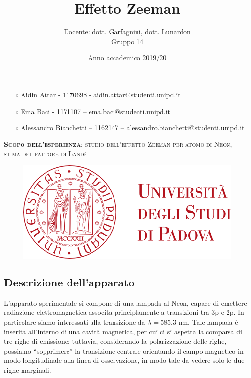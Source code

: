 \documentclass{article}
\title{Effetto Zeeman}
\author{Docente: dott. Garfagnini, dott. Lunardon \\
	Gruppo 14}
\date{Anno accademico 2019/20}
\begin{document}
	
	
	
	\maketitle
	
	\begin{itemize}
		\item[$\circ$] Aidin Attar - 1170698 - aidin.attar@studenti.unipd.it
		\item[$\circ$] Ema Baci - 1171107 – ema.baci@studenti.unipd.it
		\item[$\circ$] Alessandro Bianchetti – 1162147 – alessandro.bianchetti@studenti.unipd.it
	\end{itemize}
	
	\vspace{3 cm}
	\begin{large}\textsc{\textbf{Scopo dell'esperienza}: studio dell'effetto Zeeman per atomo di Neon, stima del fattore di Landè} 
	\end{large}
	\vspace{8.5cm}
	
	\begin{figure}[H]
		\centering
	\includegraphics[scale = 0.5 , angle=0]{unipd_logo.png}
	\end{figure}
	
	
	\twocolumn
	
	\subsection*{Descrizione dell'apparato} 
	
	L'apparato sperimentale si compone di una lampada al Neon, capace di emettere
	radiazione elettromagnetica associta principlamente a transizioni tra 3p e 2p.
	In particolare siamo interessati alla transizione da $\lambda = $585.3 nm.
	Tale lampada è inserita all'interno di una cavità magnetica, per cui ci si 
	aspetta la comparsa di tre righe di emissione: tuttavia, considerando la 
	polarizzazione delle righe, possiamo “sopprimere” la transizione centrale
	orientando il campo magnetico in modo longitudinale alla linea di 
	osservazione, in modo tale da vedere solo le due righe marginali. 
	
\end{document}
